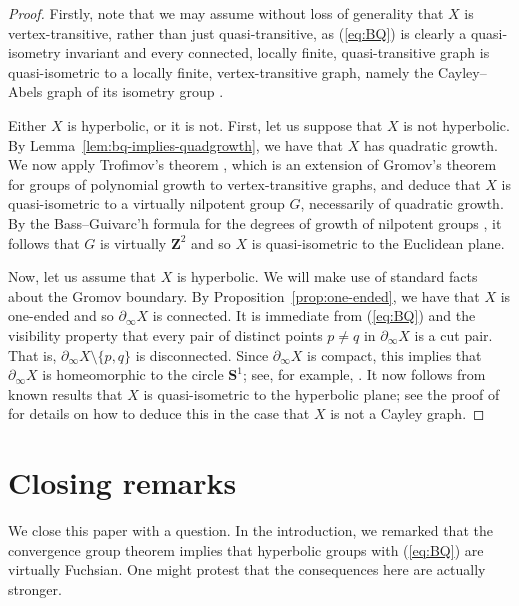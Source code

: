 \documentclass[11pt,a4paper]{amsart}
\newcommand{\Z}{\mathbf{Z}}
\theoremstyle{definition}
\newcommand{\property}{(\ref{eq:BQ})}
\begin{document}
\begin{proof}
    Firstly, note that we may assume without loss of generality that $X$ is vertex-transitive, rather than just quasi-transitive, as \property{} is clearly a quasi-isometry invariant and every connected, locally finite, quasi-transitive graph is quasi-isometric to a locally finite, vertex-transitive graph, namely the Cayley--Abels graph of its isometry group \cite[\S2.E]{Cornulier2014}. 

    Either $X$ is hyperbolic, or it is not. First, let us suppose that $X$ is not hyperbolic. 
    By Lemma~\ref{lem:bq-implies-quadgrowth}, we have that $X$ has quadratic growth. We now apply Trofimov's theorem \cite[Thm.~1]{trofimov1985graphs}, which is an extension of Gromov's theorem for groups of polynomial growth \cite{gromov1981groups} to vertex-transitive graphs, and deduce that $X$ is quasi-isometric to a virtually nilpotent group $G$, necessarily of quadratic growth. By the Bass--Guivarc'h formula for the degrees of growth of nilpotent groups \cite{bass1972degree, guivarc1973croissance}, it follows that $G$ is virtually $\Z^2$ and so $X$ is quasi-isometric to the Euclidean plane.

    Now, let us assume that $X$ is hyperbolic. 
    We will make use of standard facts about the Gromov boundary. 
    By Proposition~\ref{prop:one-ended}, we have that $X$ is one-ended and so $\partial_\infty X$ is connected. 
    It is immediate from \property{} and the visibility property that every pair of distinct points $p\neq q$ in $\partial_\infty X$ is a cut pair. That is, $\partial_\infty X \setminus \{p,q\}$ is disconnected.
    Since $\partial_\infty X$ is compact, this implies that $\partial_\infty X$ is homeomorphic to the circle $\mathbf S^1$; see, for example, \cite[Thm.~IV.12.1]{newman1951elements}.  
    It now follows from known results that $X$ is quasi-isometric to the hyperbolic plane; see the proof of \cite[Thm.~1.1]{macmanus2024note} for details on how to deduce this in the case that $X$ is not a Cayley graph.
\end{proof}


\section{Closing remarks}

We close this paper with a question. In the introduction, we remarked that the convergence group theorem implies that hyperbolic groups with \property{} are virtually Fuchsian. One might protest that the consequences here are actually stronger. 
\end{document}
